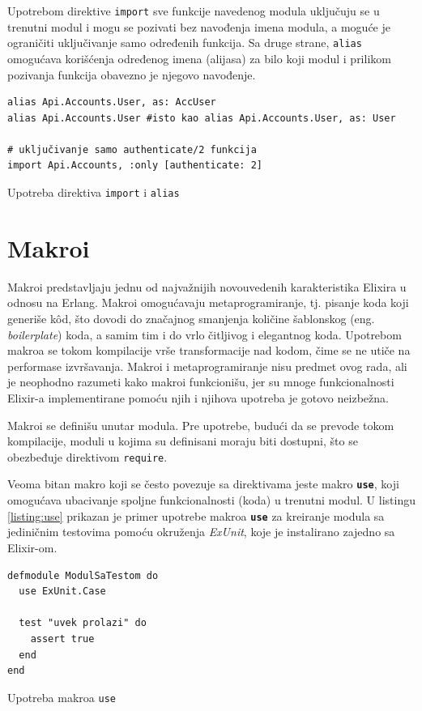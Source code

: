 \documentclass[12pt,oneside]{memoir}
\begin{document}
Upotrebom direktive \texttt{import} sve funkcije navedenog modula uključuju se u trenutni
modul i mogu se pozivati bez navođenja imena modula, a moguće je ograničiti uključivanje samo
određenih funkcija. Sa druge strane, \texttt{alias} omogućava korišćenja određenog imena
(alijasa) za bilo koji modul i prilikom pozivanja funkcija obavezno je njegovo navođenje.
\begin{listing}[h]
\begin{verbatim}
alias Api.Accounts.User, as: AccUser
alias Api.Accounts.User #isto kao alias Api.Accounts.User, as: User

# uključivanje samo authenticate/2 funkcija 
import Api.Accounts, :only [authenticate: 2] 
\end{verbatim}
\caption{Upotreba direktiva \texttt{import} i \texttt{alias}}
\label{listing:elixirAliasImport}
\end{listing}

\section{Makroi}
Makroi predstavljaju jednu od najvažnijih novouvedenih karakteristika Elixira u odnosu na Erlang.
Makroi omogućavaju metaprogramiranje, tj. pisanje koda koji generiše k\^{o}d, što dovodi do 
značajnog smanjenja količine šablonskog (eng. \emph{boilerplate}) koda, a samim tim i do
vrlo čitljivog i elegantnog koda. Upotrebom makroa se tokom kompilacije vrše transformacije
nad kodom, čime se ne utiče na performase izvršavanja. Makroi i metaprogramiranje nisu predmet
ovog rada, ali je neophodno razumeti kako makroi funkcionišu, jer su mnoge funkcionalnosti
Elixir-a implementirane pomoću njih i njihova upotreba je gotovo neizbežna. 

Makroi se definišu unutar modula. Pre upotrebe, budući da se prevode tokom kompilacije, moduli
u kojima su definisani moraju biti dostupni, što se obezbeđuje direktivom \texttt{require}. 

Veoma bitan makro koji se često povezuje sa direktivama jeste makro \texttt{\textbf{use}},
koji omogućava ubacivanje spoljne funkcionalnosti (koda) u trenutni modul. U listingu 
\ref{listing:use} prikazan je primer upotrebe makroa \texttt{\textbf{use}} za kreiranje modula
sa jediničnim testovima pomoću okruženja \emph{ExUnit}, koje je instalirano zajedno sa Elixir-om.
\begin{listing}[h]
\begin{verbatim}
defmodule ModulSaTestom do
  use ExUnit.Case

  test "uvek prolazi" do
    assert true
  end
end
\end{verbatim}
\caption{Upotreba makroa \texttt{use}}
\label{listing:use}
\end{listing}
  
\end{document}
